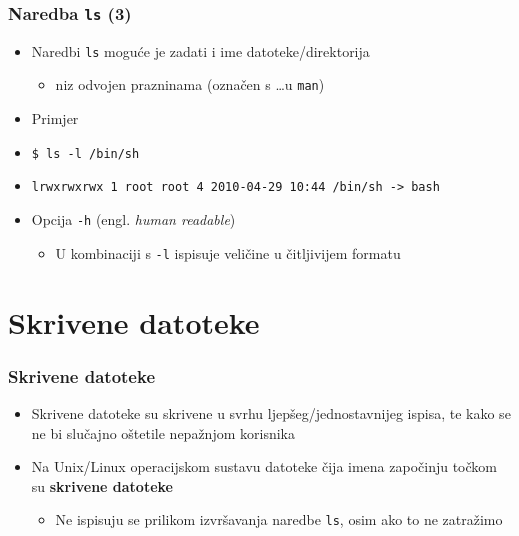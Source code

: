 \documentclass{beamer}
\begin{document}
\begin{frame}[t]
\frametitle{Naredba \texttt{ls} (3)}
\begin{itemize}
  \item Naredbi \texttt{ls} moguće je zadati i ime datoteke/direktorija
  \begin{itemize}
    \item niz odvojen prazninama (označen s \ldots u \texttt{man})
  \end{itemize}
  \item Primjer
  \item[] \small\texttt{\$ ls -l /bin/sh}
  \item[] \small\texttt{lrwxrwxrwx 1 root root 4 2010-04-29 10:44 /bin/sh 
                        -> bash}
  \item Opcija \texttt{-h} (engl. \emph{human readable})
  \begin{itemize}
    \item U kombinaciji s \texttt{-l} ispisuje veličine u čitljivijem
          formatu
  \end{itemize}
\end{itemize}
\end{frame}

\section{Skrivene datoteke}
\begin{frame}[t]
\frametitle{Skrivene datoteke}
\begin{itemize}
  \item Skrivene datoteke su skrivene u svrhu ljepšeg/jednostavnijeg ispisa, te kako se ne bi slučajno oštetile nepažnjom korisnika
  \item Na Unix/Linux operacijskom sustavu datoteke čija imena započinju
        točkom su \textbf{skrivene datoteke}
  \begin{itemize}
    \item Ne ispisuju se prilikom izvršavanja naredbe \texttt{ls}, osim
          ako to ne zatražimo
  \end{itemize}
\end{itemize}
\end{frame}
\end{document}
